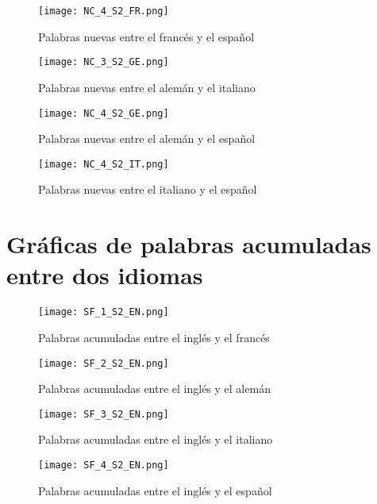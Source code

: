 \begin{figure}[h!]
	\centering
	\texttt{[image: NC\_4\_S2\_FR.png]}
	\label{fig.NC_FS}
	\caption{Palabras nuevas entre el francés y el español}
\end{figure}

\begin{figure}[h!]
	\centering
	\texttt{[image: NC\_3\_S2\_GE.png]}
	\label{fig.NC_GI}
	\caption{Palabras nuevas entre el alemán y el italiano}
\end{figure}

\begin{figure}[h!]
	\centering
	\texttt{[image: NC\_4\_S2\_GE.png]}
	\label{fig.NC_GS}
	\caption{Palabras nuevas entre el alemán y el español}
\end{figure}

\begin{figure}[h!]
	\centering
	\texttt{[image: NC\_4\_S2\_IT.png]}
	\label{fig.NC_IS}
	\caption{Palabras nuevas entre el italiano y el español}
\end{figure}





\clearpage



\section{Gráficas de palabras acumuladas entre dos idiomas}

\begin{figure}[h!]
	\centering
	\texttt{[image: SF\_1\_S2\_EN.png]}
	\label{fig.SF_EF}
	\caption{Palabras acumuladas entre el inglés y el francés}
\end{figure}


\begin{figure}[h!]
	\centering
	\texttt{[image: SF\_2\_S2\_EN.png]}
	\label{fig.SF_EG}
	\caption{Palabras acumuladas entre el inglés y el alemán}
\end{figure}


\begin{figure}[h!]
	\centering
	\texttt{[image: SF\_3\_S2\_EN.png]}
	\label{fig.SF_EI}
	\caption{Palabras acumuladas entre el inglés y el italiano}
\end{figure}

\begin{figure}[h!]
	\centering
	\texttt{[image: SF\_4\_S2\_EN.png]}
	\label{fig.SF_ES}
	\caption{Palabras acumuladas entre el inglés y el español}
\end{figure}

